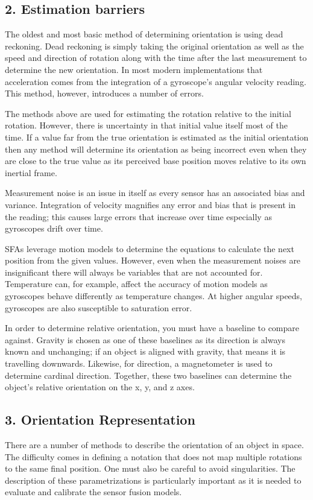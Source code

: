 \documentclass[10pt]{report}
\begin{document}
\newpage

\subsection*{2. Estimation barriers}
The oldest and most basic method of determining orientation is using dead reckoning. Dead reckoning is simply taking the original orientation as well as the speed and direction of rotation along with the time after the last measurement to determine the new orientation. In most modern implementations that acceleration comes from the integration of a gyroscope's angular velocity reading. This method, however, introduces a number of errors.

The methods above are used for estimating the rotation relative to the initial rotation. However, there is uncertainty in that initial value itself most of the time. If a value far from the true orientation is estimated as the initial orientation then any method will determine its orientation as being incorrect even when they are close to the true value as its perceived base position moves relative to its own inertial frame.

Measurement noise is an issue in itself as every sensor has an associated bias and variance. Integration of velocity magnifies any error and bias that is present in the reading; this causes large errors that increase over time especially as gyroscopes drift over time.

SFAs leverage motion models to determine the equations to calculate the next position from the given values. However, even when the measurement noises are insignificant there will always be variables that are not accounted for. Temperature can, for example, affect the accuracy of motion models as gyroscopes behave differently as temperature changes. At higher angular speeds, gyroscopes are also susceptible to saturation error.

In order to determine relative orientation, you must have a baseline to compare against. Gravity is chosen as one of these baselines as its direction is always known and unchanging; if an object is aligned with gravity, that means it is travelling downwards. Likewise, for direction, a magnetometer is used to determine cardinal direction. Together, these two baselines can determine the object’s relative orientation on the x, y, and z axes. 

\newpage
\subsection*{3. Orientation Representation}
There are a number of methods to describe the orientation of an object in space. The difficulty comes in defining a notation that does not map multiple rotations to the same final position. One must also be careful to avoid singularities. The description of these parametrizations is particularly important as it is needed to evaluate and calibrate the sensor fusion models.
\end{document}
